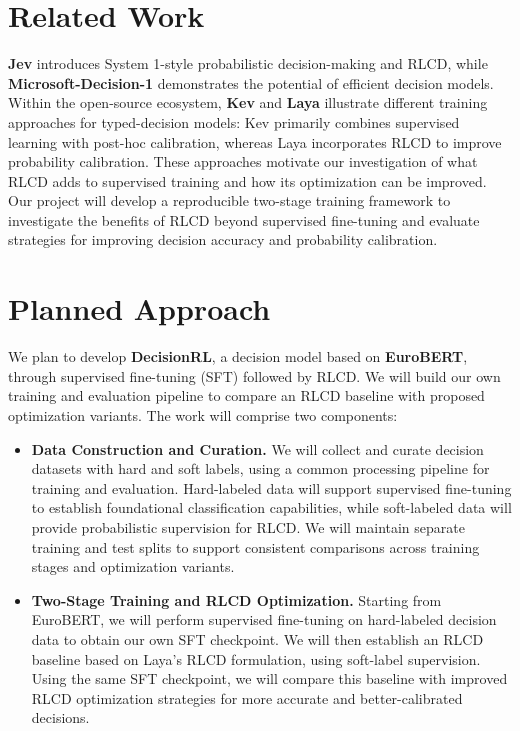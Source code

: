 \documentclass[10pt,a4paper]{article}
\begin{document}
\section*{Related Work}

\textbf{Jev} introduces System 1-style probabilistic
decision-making and RLCD, while
\textbf{Microsoft-Decision-1} demonstrates the potential
of efficient decision models.
Within the open-source ecosystem, \textbf{Kev} and
\textbf{Laya} illustrate different training approaches
for typed-decision models: Kev primarily combines
supervised learning with post-hoc calibration,
whereas Laya incorporates RLCD to improve probability
calibration.
These approaches motivate our investigation of what
RLCD adds to supervised training and how its
optimization can be improved.
Our project will develop a reproducible two-stage
training framework to investigate the benefits of RLCD
beyond supervised fine-tuning and evaluate strategies
for improving decision accuracy and probability calibration.


\section*{Planned Approach}

We plan to develop \textbf{DecisionRL}, a decision model
based on \textbf{EuroBERT}, through supervised
fine-tuning (SFT) followed by RLCD.
We will build our own training and evaluation pipeline
to compare an RLCD baseline with proposed optimization
variants.
The work will comprise two components:

\begin{itemize}

  \item \textbf{Data Construction and Curation.}
  We will collect and curate decision datasets with
  hard and soft labels, using a common processing
  pipeline for training and evaluation.
  Hard-labeled data will support supervised fine-tuning
  to establish foundational classification capabilities,
  while soft-labeled data will provide probabilistic
  supervision for RLCD.
  We will maintain separate training and test splits
  to support consistent comparisons across training
  stages and optimization variants.

  \item \textbf{Two-Stage Training and RLCD Optimization.}
  Starting from EuroBERT, we will perform supervised
  fine-tuning on hard-labeled decision data to obtain
  our own SFT checkpoint.
  We will then establish an RLCD baseline based on
  Laya's RLCD formulation, using soft-label supervision.
  Using the same SFT checkpoint, we will compare this
  baseline with improved RLCD optimization strategies
  for more accurate and better-calibrated decisions.

\end{itemize}
\end{document}
